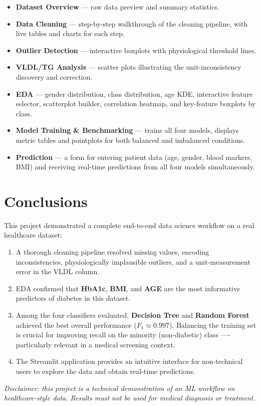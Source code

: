 \documentclass[12pt, a4paper]{article}
\begin{document}
\begin{itemize}
    \item \textbf{Dataset Overview} --- raw data preview and summary statistics.
    \item \textbf{Data Cleaning} --- step-by-step walkthrough of the cleaning
          pipeline, with live tables and charts for each step.
    \item \textbf{Outlier Detection} --- interactive boxplots with physiological
          threshold lines.
    \item \textbf{VLDL/TG Analysis} --- scatter plots illustrating the
          unit-inconsistency discovery and correction.
    \item \textbf{EDA} --- gender distribution, class distribution, age KDE,
          interactive feature selector, scatterplot builder, correlation
          heatmap, and key-feature boxplots by class.
    \item \textbf{Model Training \& Benchmarking} --- trains all four models,
          displays metric tables and pointplots for both balanced and imbalanced
          conditions.
    \item \textbf{Prediction} --- a form for entering patient data (age, gender,
          blood markers, BMI) and receiving real-time predictions from all four
          models simultaneously.
\end{itemize}

\section{Conclusions}

This project demonstrated a complete end-to-end data science workflow on a
real healthcare dataset:

\begin{enumerate}
    \item A thorough cleaning pipeline resolved missing values, encoding
          inconsistencies, physiologically implausible outliers, and a
          unit-measurement error in the VLDL column.
    \item EDA confirmed that \textbf{HbA1c}, \textbf{BMI}, and \textbf{AGE} are
          the most informative predictors of diabetes in this dataset.
    \item Among the four classifiers evaluated, \textbf{Decision Tree} and
          \textbf{Random Forest} achieved the best overall performance
          ($F_1 \approx 0.997$). Balancing the training set is crucial for
          improving recall on the minority (non-diabetic) class —- particularly
          relevant in a medical screening context.
    \item The Streamlit application provides an intuitive interface for
          non-technical users to explore the data and obtain real-time
          predictions.
\end{enumerate}

\vspace{1em}
\noindent\textit{Disclaimer: this project is a technical demonstration of an
ML workflow on healthcare-style data. Results must not be used for medical
diagnosis or treatment.}
\end{document}

